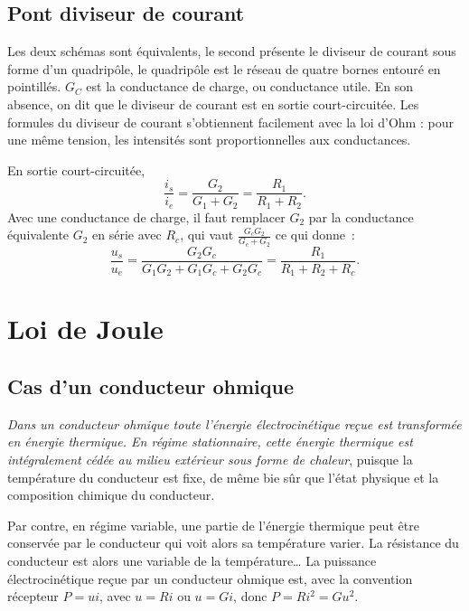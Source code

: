 \subsection{Pont diviseur de courant}%
Les deux schémas sont équivalents, le second présente le diviseur de courant 
sous forme d'un quadripôle, le quadripôle est le réseau de quatre bornes 
entouré en pointillés. \(G_C\) est la conductance de charge, ou conductance 
utile. En son absence, on dit que le diviseur de courant est en sortie 
court-circuitée. Les formules du diviseur de courant s'obtiennent facilement 
avec la loi d'Ohm : pour une même tension, les intensités sont proportionnelles 
aux conductances.

En sortie court-circuitée,
\begin{equation}\label{eq:pontdiviseuri}%
\frac{i_s}{i_e} = \frac{G_2}{G_1+G_2} = \frac{R_1}{R_1+R_2}.%
\end{equation}%
Avec une conductance de charge, il faut remplacer \(G_2\) par la conductance 
équivalente \(G_2\) en série avec \(R_c\), qui vaut \(\frac{G_cG_2}{G_c+G_2}\) 
ce qui donne~:
\begin{equation}\label{eq:diviseuri_gc}%
\frac{u_s}{u_e} = \frac{G_2G_c}{G_1G_2+G_1G_c+G_2G_c} = 
  \frac{R_1}{R_1+R_2+R_c}.%
\end{equation}%

\section{Loi de Joule}%
\subsection{Cas d'un conducteur ohmique}%

\emph{Dans un conducteur ohmique toute l'énergie électrocinétique reçue est 
transformée en énergie thermique. En régime stationnaire, cette énergie 
thermique est intégralement cédée au milieu extérieur sous forme de chaleur}, 
puisque la température du conducteur est fixe, de même bie sûr que l'état 
physique et la composition chimique du conducteur.%

Par contre, en régime variable, une partie de l'énergie thermique peut être 
conservée par le conducteur qui voit alors sa température varier. La résistance 
du conducteur est alors une variable de la température\ldots{} La puissance 
électrocinétique reçue par un conducteur ohmique est, avec la convention 
récepteur \(P = ui\), avec \(u=Ri\) ou \(u=Gi\), donc \(P=R i^2 = G u^2\).

